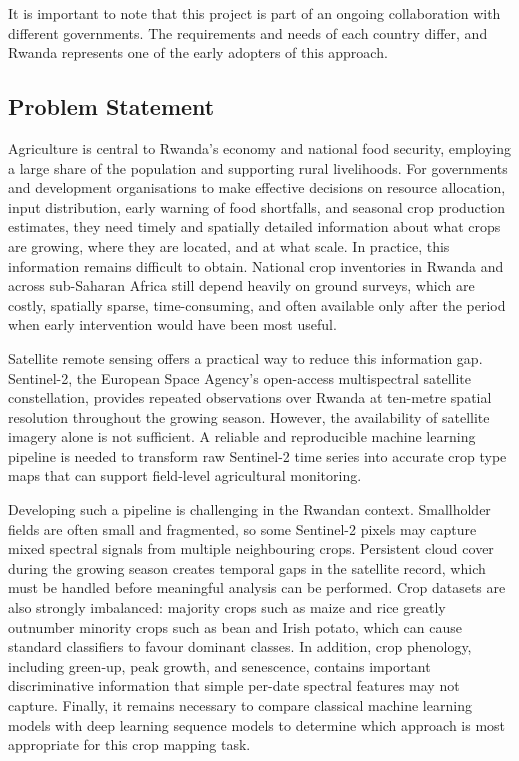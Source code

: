 It is important to note that this project is part of an ongoing collaboration
with different governments. The requirements and needs of each country differ,
and Rwanda represents one of the early adopters of this approach.


\subsection{Problem Statement}

\label{sec:intro_prob_art}


Agriculture is central to Rwanda's economy and national food security,
employing a large share of the population and supporting rural livelihoods.
For governments and development organisations to make effective decisions on
resource allocation, input distribution, early warning of food shortfalls, and
seasonal crop production estimates, they need timely and spatially detailed
information about what crops are growing, where they are located, and at what
scale. In practice, this information remains difficult to obtain. National crop
inventories in Rwanda and across sub-Saharan Africa still depend heavily on
ground surveys, which are costly, spatially sparse, time-consuming, and often
available only after the period when early intervention would have been most
useful.

Satellite remote sensing offers a practical way to reduce this information
gap. Sentinel-2, the European Space Agency's open-access multispectral
satellite constellation, provides repeated observations over Rwanda at
ten-metre spatial resolution throughout the growing season. However, the
availability of satellite imagery alone is not sufficient. A reliable and
reproducible machine learning pipeline is needed to transform raw Sentinel-2
time series into accurate crop type maps that can support field-level
agricultural monitoring.

Developing such a pipeline is challenging in the Rwandan context. Smallholder
fields are often small and fragmented, so some Sentinel-2 pixels may capture
mixed spectral signals from multiple neighbouring crops. Persistent cloud cover
during the growing season creates temporal gaps in the satellite record, which
must be handled before meaningful analysis can be performed. Crop datasets are
also strongly imbalanced: majority crops such as maize and rice greatly
outnumber minority crops such as bean and Irish potato, which can cause
standard classifiers to favour dominant classes. In addition, crop phenology,
including green-up, peak growth, and senescence, contains important
discriminative information that simple per-date spectral features may not
capture. Finally, it remains necessary to compare classical machine learning
models with deep learning sequence models to determine which approach is most
appropriate for this crop mapping task.

